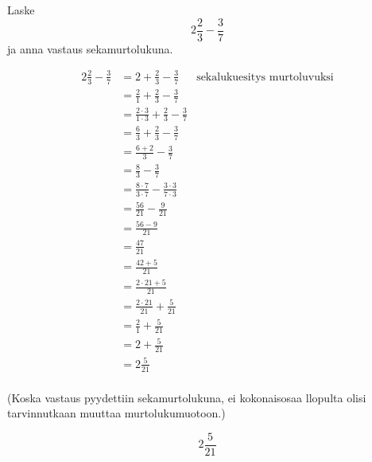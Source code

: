 \newpage
\begin{esimerkki}
        Laske \[2\frac{2}{3} - \frac{3}{7}\] ja anna vastaus sekamurtolukuna.
        
        \begin{esimratk}
        \begin{align*}
            2\frac{2}{3} - \frac{3}{7}&=2+\frac{2}{3} - \frac{3}{7} & \text{sekalukuesitys murtoluvuksi}\\
            &=\frac{2}{1}+\frac{2}{3} - \frac{3}{7}\\
            &=\frac{2\cdot3}{1\cdot3}+\frac{2}{3}-\frac{3}{7}\\
            &=\frac{6}{3}+\frac{2}{3}-\frac{3}{7}\\
            &=\frac{6+2}{3} - \frac{3}{7} \\
            &=\frac{8}{3} - \frac{3}{7}\\
            &=\frac{8\cdot7}{3\cdot7} - \frac{3\cdot3}{7\cdot3}\\
            &=\frac{56}{21} - \frac{9}{21}\\
            &=\frac{56-9}{21}\\
            &=\frac{47}{21}\\
            &=\frac{42+5}{21}\\ 
            &=\frac{2\cdot21+5}{21}\\ %
            &=\frac{2\cdot21}{21}+\frac{5}{21}\\ %
            &=\frac{2}{1}+\frac{5}{21}\\
            &=2+\frac{5}{21}\\
            &=2\frac{5}{21}\\
        \end{align*}
        
        (Koska vastaus pyydettiin sekamurtolukuna, ei kokonaisosaa llopulta olisi tarvinnutkaan muuttaa murtolukumuotoon.) \end{esimratk}
        \begin{esimvast}
$$2\frac{5}{21}$$
        \end{esimvast}
    \end{esimerkki}

